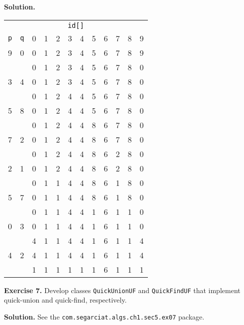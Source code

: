 \documentclass[12pt, a4paper]{article}
\newenvironment{ex}[2][Exercise]
{\par\medskip\noindent \textbf{#1 #2.}}
{\medskip}
\newenvironment{sol}[1][Solution]
{\par\medskip\noindent \textbf{#1.} }
{\medskip}
\begin{document}
	\begin{sol}
		\begin{center}
			\begin{tabular}{cc|cccccccccc}
				\multicolumn{12}{c}{\texttt{id[]}}\\
				\texttt{p} & \texttt{q} & 0 & 1 & 2 & 3 & 4 & 5 & 6 & 7 & 8 & 9\\
				\hline
				9  & 0  & {\color{green} 0} & 1 & 2 & 3 & 4 & 5 & 6 & 7 & 8 & {\color{green} 9}\\
				{} & {} & 0 & 1 & 2 & 3 & 4 & 5 & 6 & 7 & 8 & {\color{red} 0}\\
				3  & 4  & 0 & 1 & 2 & {\color{green} 3} & {\color{green} 4} & 5 & 6 & 7 & 8 & 0\\
				{} & {} & 0 & 1 & 2 & {\color{red} 4} & 4 & 5 & 6 & 7 & 8 & 0 \\
				5  & 8  & 0 & 1 & 2 & 4 & 4 & {\color{green} 5} & 6 & 7 & {\color{green} 8} & 0\\
				{} & {} & 0 & 1 & 2 & 4 & 4 & {\color{red} 8} & 6 & 7 & 8 & 0\\
				7  & 2  & 0 & 1 & {\color{green} 2} & 4 & 4 & 8 & 6 & {\color{green} 7} & 8 & 0\\
				{} & {} & 0 & 1 & 2 & 4 & 4 & 8 & 6 & {\color{red} 2} & 8 & 0 \\
				2  & 1  & 0 & {\color{green} 1} & {\color{green} 2} & 4 & 4 & 8 & 6 & 2 & 8 & 0 \\
				{} & {} & 0 & 1 & {\color{red} 1} & 4 & 4 & 8 & 6 & {\color{red} 1} & 8 & 0 \\
				5  & 7  & 0 & 1 & 1 & 4 & 4 & {\color{green} 8} & 6 & {\color{green} 1} & 8 & 0 \\
				{} & {} & 0 & 1 & 1 & 4 & 4 & {\color{red} 1} & 6 & 1 & {\color{red} 1} & 0 \\
				0  & 3  & {\color{green} 0} & 1 & 1 & {\color{green} 4} & 4 & 1 & 6 &  1 & 1 & 0 \\
				{} & {} & {\color{red} 4} & 1 & 1 & 4 & 4 & 1 & 6 &  1 & 1 & {\color{red} 4} \\
				4  & 2  & 4 & 1 & {\color{green} 1} & 4 & {\color{green} 4} & 1 & 6 &  1 & 1 & 4 \\
				{} & {} & {\color{red} 1} & 1 & 1 & {\color{red} 1} & {\color{red} 1} & 1 & 6 &  1 & 1 & {\color{red} 1} \\
			\end{tabular}
		\end{center}
	\end{sol}
	\begin{ex}{7}
		Develop classes \texttt{QuickUnionUF} and \texttt{QuickFindUF} that implement quick-union
		and quick-find, respectively.
	\end{ex}
	\begin{sol}
		See the \texttt{com.segarciat.algs.ch1.sec5.ex07} package.
	\end{sol}
	\pagebreak
	\printbibliography
\end{document}
